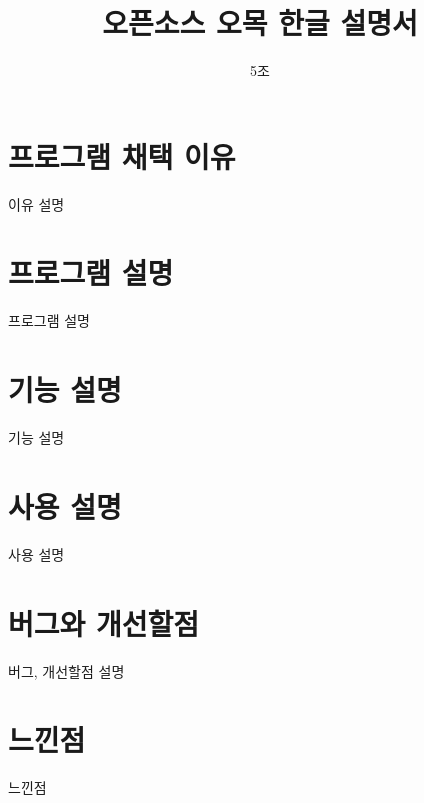 \documentclass[a4paper, 11pt]{article}
\title{오픈소스 오목 한글 설명서}
\author{5조}
\begin{document}
\maketitle
\section{프로그램 채택 이유}
이유 설명
\section{프로그램 설명}
프로그램 설명
\section{기능 설명}
기능 설명
\section{사용 설명}
사용 설명
\section{버그와 개선할점}
버그, 개선할점 설명
\section{느낀점}
느낀점
\end{document}
